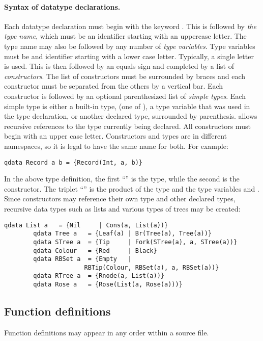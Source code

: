 \paragraph{Syntax of datatype declarations.}
Each datatype declaration must begin with the keyword . This is
followed by \emph{the type name}, which must be an identifier 
starting with an uppercase letter. The type name may also be followed by
 any number of \emph{type variables}. Type variables must be and identifier starting
with a lower case letter. Typically, a single letter is used.
This is then followed by an equals sign
and   completed by a list of \emph{constructors}. The list of constructors
must be surrounded by 
braces and each constructor must be separated from the others 
by a vertical bar. Each constructor is followed by an optional parenthesized
list of \emph{simple types}. 
Each simple type is either a built-in type, (one of 
), a type variable that was used in the
type declaration, or another declared type, surrounded by 
parenthesis. \lqpl{} allows recursive
references to the type currently being declared. All constructors must
begin with an upper case letter. Constructors and types are in different
namespaces, so it is legal to have the same name for both. For example:
\begin{lstlisting}[style=linqplnonum]
       qdata Record a b = {Record(Int, a, b)}
\end{lstlisting}
In the above type definition,
 the first ``'' is the type, while the second is the 
constructor. The triplet ``'' is the product of the
type  and the type variables  and .
Since constructors may reference their own type and other 
declared types, recursive 
data types such as lists and various types of
 trees may be created:

\begin{lstlisting}[style=linqplnonum]
        qdata List a   = {Nil     | Cons(a, List(a))}
        qdata Tree a   = {Leaf(a) | Br(Tree(a), Tree(a))}
        qdata STree a  = {Tip     | Fork(STree(a), a, STree(a))}
        qdata Colour   = {Red     | Black}
        qdata RBSet a  = {Empty   |
	                  RBTip(Colour, RBSet(a), a, RBSet(a))}
        qdata RTree a  = {Rnode(a, List(a))}
        qdata Rose a   = {Rose(List(a, Rose(a)))} 
\end{lstlisting}
\subsection{Function definitions}\label{subsec:functiondefinitions}
Function definitions may appear in any order within a
\lqpl{} source file. 
